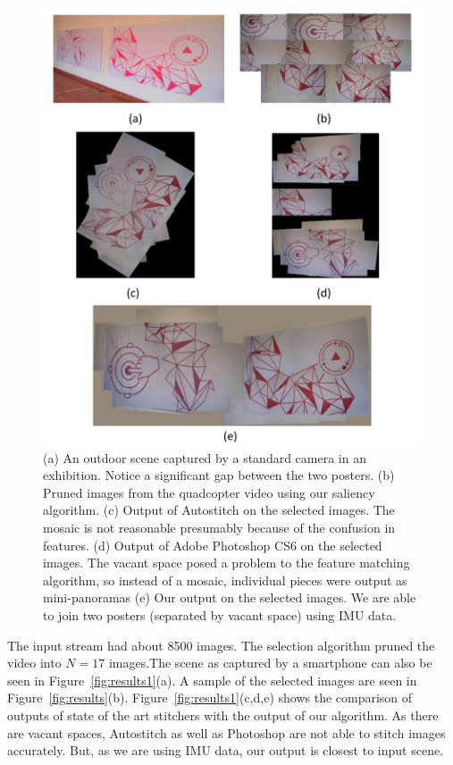 \documentclass[10pt,twocolumn,letterpaper]{article}
\begin{document}
\begin{figure}[h!]
\centering
\includegraphics[width=0.85\linewidth]{figures/Purple_red.pdf}
\caption{(a) An outdoor scene captured by a standard camera in an
  exhibition. Notice a   significant gap between the two posters.  (b) Pruned
  images from the quadcopter video using our saliency algorithm. (c) Output of
  Autostitch on the selected images. The mosaic is not reasonable
  presumably because of the confusion in features. (d) Output of Adobe
  Photoshop CS6 on the selected images. The vacant space posed a
  problem to the feature matching algorithm, so instead of a mosaic,
  individual pieces were output as mini-panoramas (e) Our output on
  the selected images. We are able to join two posters (separated by
  vacant space) using IMU data.}
\label{fig:results2}
\end{figure}
	
The input stream had about 8500 images. The selection
algorithm pruned the video into $N=17$ images.The scene as captured by a smartphone can also be seen in
Figure~\ref{fig:results1}(a). A sample of the
selected images are seen in Figure~\ref{fig:results}(b).
Figure~\ref{fig:results1}(c,d,e) shows the comparison of outputs of state
of the art stitchers with the output of our algorithm. As there are vacant
spaces, Autostitch as well as Photoshop are not able to stitch images
accurately. But, as we are using IMU data, our output is closest to input scene.
	
\end{document}
